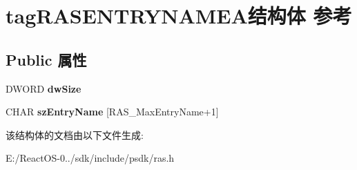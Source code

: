 \hypertarget{structtag_r_a_s_e_n_t_r_y_n_a_m_e_a}{}\section{tag\+R\+A\+S\+E\+N\+T\+R\+Y\+N\+A\+M\+E\+A结构体 参考}
\label{structtag_r_a_s_e_n_t_r_y_n_a_m_e_a}
\subsection*{Public 属性}
\begin{DoxyCompactItemize}
\item 
\mbox{\label{structtag_r_a_s_e_n_t_r_y_n_a_m_e_a_a971de2d7d5e423a713d679f9d89ec896}} 
D\+W\+O\+RD {\bfseries dw\+Size}
\item 
\mbox{\label{structtag_r_a_s_e_n_t_r_y_n_a_m_e_a_aeb8d5421543517d19decefa2b4a113b4}} 
C\+H\+AR {\bfseries sz\+Entry\+Name} \mbox{[}R\+A\+S\+\_\+\+Max\+Entry\+Name+1\mbox{]}
\end{DoxyCompactItemize}


该结构体的文档由以下文件生成\+:\begin{DoxyCompactItemize}
\item 
E\+:/\+React\+O\+S-\/0../sdk/include/psdk/ras.\+h\end{DoxyCompactItemize}
